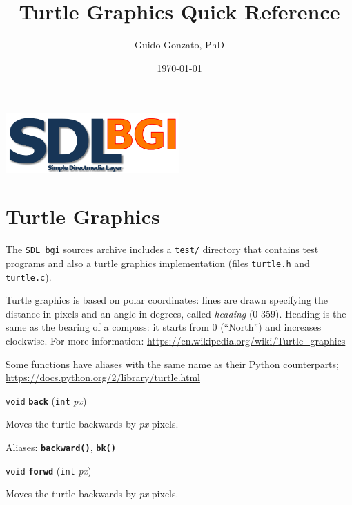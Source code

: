 \documentclass[a4paper,11pt]{article}
\newcommand{\SDLbgi}{\texttt{SDL\_bgi}}
\newcommand{\V}{\texttt{void}}      %
\newcommand{\I}{\texttt{int}}       %
\newcommand{\func}[1]{\textbf{\texttt{#1}}}  %
\newcommand{\A}[1]{\emph{#1}}       %
\newcommand{\file}[1]{\texttt{#1}}
\newenvironment{bgi}
{ %
  \begin{snugshade}
}
{ %
  \end{snugshade}
}
\begin{document}
\title{Turtle Graphics Quick Reference}

\author{Guido Gonzato, PhD}

\date{\today}

\maketitle

\begin{center}
  \includegraphics[width=0.5\textwidth]{SDL_bgi_logo.png}  
\end{center}


\section{Turtle Graphics}

The \SDLbgi{} sources archive includes a \file{test/} directory that
contains test programs and also a turtle graphics implementation
(files \file{turtle.h} and \file{turtle.c}).

Turtle graphics is based on polar coordinates: lines are drawn
specifying the distance in pixels and an angle in degrees, called
\emph{heading} (0-359). Heading is the same as the bearing of a
compass: it starts from 0 (``North'') and increases clockwise. For
more information: \url{https://en.wikipedia.org/wiki/Turtle_graphics}

Some functions have aliases with the same name as their Python
counterparts; \url{https://docs.python.org/2/library/turtle.html}


\begin{bgi}
\V{} \func{back} (\I{} \A{px})
\end{bgi}

Moves the turtle backwards by \A{px} pixels.

Aliases: \func{backward()}, \func{bk()}


\begin{bgi}
\V{} \func{forwd} (\I{} \A{px})
\end{bgi}

Moves the turtle backwards by \A{px} pixels.
\end{document}
